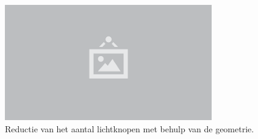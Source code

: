 \begin{figure}
  \centering
  \includegraphics[width=0.8\textwidth]{./img/raw/placeholder.png}
  \caption{Reductie van het aantal lichtknopen met behulp van de geometrie.}
  \label{fig:vo-geometrie}
\end{figure}
